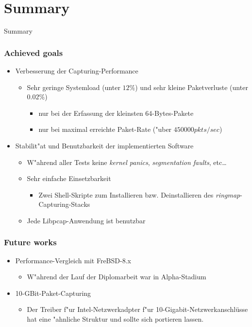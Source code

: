 \documentclass{beamer}
\begin{document}
\section{Summary}
\begin{frame}
	\begin{center}
	\huge{Summary}
	\end{center}
\end{frame}
\begin{frame}
\frametitle{Achieved goals}
\begin{itemize}
	\item Verbesserung der Capturing-Performance
		\begin{itemize}
			\item Sehr geringe Systemload (unter $12\%$) und sehr kleine
				Paketverluste (unter  $0.02\%$)
				\begin{itemize}
					\item nur bei der Erfassung der kleinsten 64-Bytes-Pakete
					\item nur bei maximal erreichte Paket-Rate ("uber $450000 pkts/sec$) 
				\end{itemize}
		\end{itemize}
	\item Stabilit"at und Benutzbarkeit der implementierten Software
		\begin{itemize}
			\item W"ahrend aller Tests keine \emph{kernel panics}, \emph{segmentation faults}, etc\ldots
			\item Sehr einfache Einsetzbarkeit
				\begin{itemize}
					\item Zwei Shell-Skripte zum Installieren bzw. Deinstallieren des 
						\emph{ringmap}-Capturing-Stacks
				\end{itemize}
			\item Jede Libpcap-Anwendung ist benutzbar
		\end{itemize}
\end{itemize}
\end{frame}

\begin{frame}
\frametitle{Future works}
\begin{itemize}
	\item Performance-Vergleich mit FreBSD-8.x
		\begin{itemize}
			\item W"ahrend der Lauf der Diplomarbeit war in Alpha-Stadium\newline
		\end{itemize}
	\item 10-GBit-Paket-Capturing
		\begin{itemize}
			\item Der Treiber f"ur Intel-Netzwerkadpter f"ur 10-Gigabit-Netzwerkanschlüsse hat 
				eine "ahnliche Struktur und sollte sich portieren lassen. 
		\end{itemize}
\end{itemize}
\end{frame}
\end{document}
